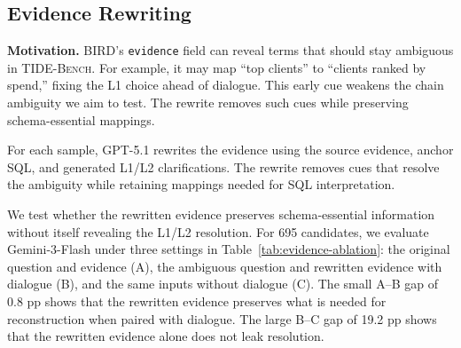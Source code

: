 \subsection{Evidence Rewriting}
\label{app:pipeline-evidence}

\noindent\textbf{Motivation.}
BIRD's \texttt{evidence} field can reveal terms that should stay ambiguous in \textsc{TIDE-Bench}. For example, it may map ``top clients'' to ``clients ranked by spend,'' fixing the L1 choice ahead of dialogue. This early cue weakens the chain ambiguity we aim to test. The rewrite removes such cues while preserving schema-essential mappings.

For each sample, GPT-5.1 rewrites the evidence using the source evidence, anchor SQL, and generated L1/L2 clarifications. The rewrite removes cues that resolve the ambiguity while retaining mappings needed for SQL interpretation.

We test whether the rewritten evidence preserves schema-essential information without itself revealing the L1/L2 resolution. For 695 candidates, we evaluate Gemini-3-Flash under three settings in Table~\ref{tab:evidence-ablation}: the original question and evidence (A), the ambiguous question and rewritten evidence with dialogue (B), and the same inputs without dialogue (C). The small A--B gap of 0.8 pp shows that the rewritten evidence preserves what is needed for reconstruction when paired with dialogue. The large B--C gap of 19.2 pp shows that the rewritten evidence alone does not leak resolution.

